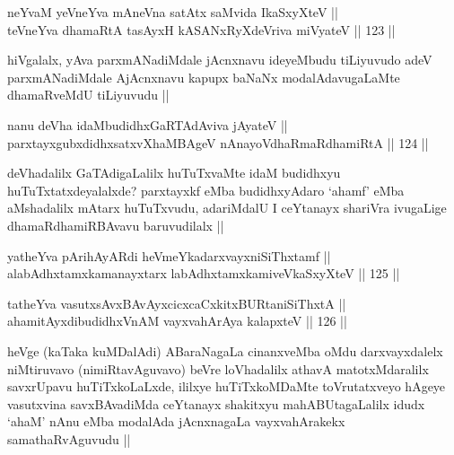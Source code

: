 
\begin{shl}
neYvaM yeVneYva mAneVna satAtx saMvida IkaSxyXteV ||  \\
teVneYva dhamaRtA tasAyxH kASANxRyXdeVriva miVyateV ||  123 ||  
\end{shl}

\begin{artha}
hiVgalalx, yAva parxmANadiMdale jAcnxnavu ideyeMbudu tiLiyuvudo adeV parxmANadiMdale AjAcnxnavu kapupx baNaNx modalAdavugaLaMte dhamaRveMdU tiLiyuvudu ||
\end{artha}


\begin{shl}
nanu deVha idaMbudidhxGaRTAdAviva jAyateV ||  \\
parxtayxgubxdidhxsatxvXhaMBAgeV nAnayoVdhaRmaRdhamiRtA ||  124 ||  
\end{shl}

\begin{artha}
deVhadalilx GaTAdigaLalilx huTuTxvaMte idaM budidhxyu huTuTxtatxdeyalalxde? parxtayxkf eMba budidhxyAdaro `ahamf' eMba aMshadalilx mAtarx huTuTxvudu, adariMdalU I ceYtanayx shariVra ivugaLige dhamaRdhamiRBAvavu baruvudilalx ||
\end{artha}


\begin{shl}
yatheYva pArihAyARdi heVmeYkadarxvayxniSiThxtamf || \\
alabAdhxtamxkamanayxtarx labAdhxtamxkamiveVkaSxyXteV ||  125 ||  
\end{shl}
				
\begin{shl}
tatheYva vasutxsAvxBAvAyxcicxcaCxkitxBURtaniSiThxtA  || \\
ahamitAyxdibudidhxVnAM vayxvahArAya kalapxteV ||  126 ||  
\end{shl}

\begin{artha}
heVge (kaTaka kuMDalAdi) ABaraNagaLa cinanxveMba oMdu darxvayxdalelx niMtiruvavo (nimiRtavAguvavo) beVre loVhadalilx athavA matotxMdaralilx savxrUpavu huTiTxkoLaLxde, ililxye huTiTxkoMDaMte toVrutatxveyo hAgeye vasutxvina savxBAvadiMda ceYtanayx shakitxyu mahABUtagaLalilx idudx `ahaM' nAnu eMba modalAda jAcnxnagaLa vayxvahArakekx samathaRvAguvudu ||
\end{artha}

